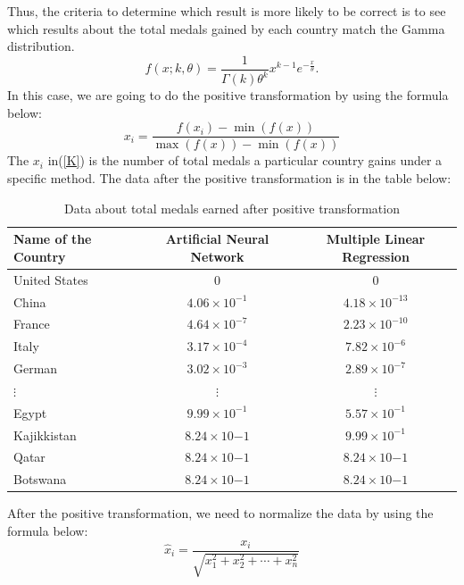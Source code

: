 \documentclass{mcmthesis}
\begin{document}
Thus, the criteria to determine which result is more likely to be correct is to see which results about the total medals gained by each country match the Gamma distribution.\\
\begin{equation}\label{eq:1}
f(x;k,\theta) =\frac{1}{\Gamma(k) \theta^k}x^{k-1}e^{-\frac{x}{\theta}}.
\end{equation}
In this case, we are going to do the positive transformation by using the formula below:
\begin{equation}\label{K}
x_i = \frac{f(x_i) - \min(f(x))}{\max(f(x)) - \min(f(x))}
\end{equation}
The $x_i$ in(\ref{K}) is the number of total medals a particular country gains under a specific method. The data after the positive transformation is in the table below:
\begin{table}[H]
\centering 
\label{A}
\caption{Data about total medals earned after positive transformation}
\vspace{5pt}
\begin{tabular}{lcc}
\hline
\textbf{Name of the Country} & \textbf{Artificial Neural Network} & \textbf{Multiple Linear Regression} \\
\hline\hline
United States & 0 & 0\\
China & $4.06\times 10^{-1}$  & $4.18\times 10^{-13}$\\
France & $4.64\times 10^{-7}$ & $2.23\times 10^{-10}$\\
Italy & $3.17\times 10^{-4}$ & $7.82\times 10^{-6}$\\
German & $3.02\times 10^{-3}$ & $2.89\times 10^{-7}$\\
$\vdots$ & $\vdots$ & $\vdots$ \\ 
Egypt & $9.99\times 10^{-1}$ & $5.57\times 10^{-1}$\\
Kajikkistan & $8.24\times 10{-1}$ & $9.99\times 10^{-1}$\\
Qatar & $8.24\times 10{-1}$ & $8.24\times 10{-1}$\\
Botswana & $8.24\times 10{-1}$ & $8.24\times 10{-1}$\\
\hline
\end{tabular}
\end{table}
After the positive transformation, we need to normalize the data by using the formula below:\\
\begin{equation}\label{V}
\hat{x}_i=\frac{x_i}{\sqrt{x_{1}^{2}+x_{2}^{2}+\cdots+x_{n}^{2}}}
\end{equation}
\end{document}
